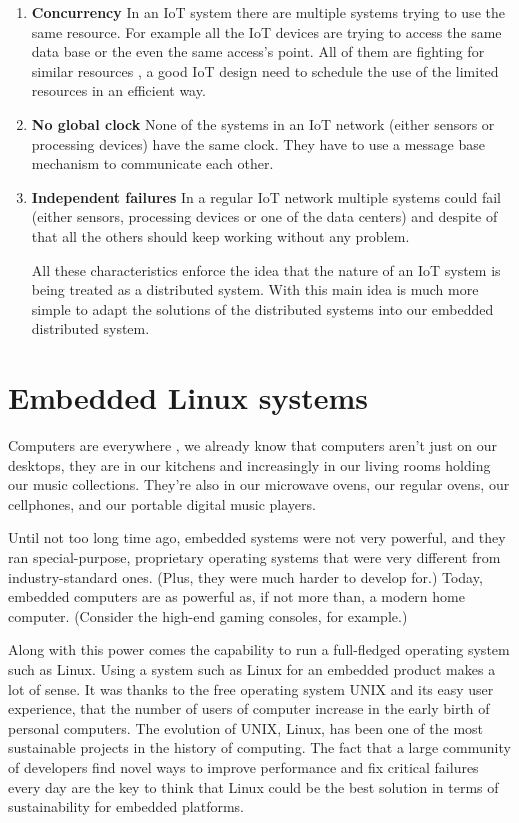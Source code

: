 \begin{enumerate}
\item \textbf{Concurrency}
In an IoT system there are multiple systems trying to use the same resource.
For example all the IoT devices are trying to access the same data base or the
even the same access's point. All of them are fighting for similar resources , a
good IoT design need to schedule the use of the limited resources in an efficient
way.

\item \textbf{No global clock}
None of the systems in an IoT network (either sensors or processing devices)
have the same clock. They have to use a message base mechanism to communicate
each other. 

\item \textbf{Independent failures}
In a regular IoT network multiple systems could fail (either sensors,
processing devices or one of the data centers) and despite of that all the
others should keep working without any problem. 

All these characteristics enforce the idea that the nature of an IoT system is
being treated as a distributed system. With this main idea is much more simple
to adapt the solutions of the distributed systems into our embedded distributed
system.

\end{enumerate}


\section{Embedded Linux systems}

Computers are everywhere , we already know that computers aren't just on our
desktops, they are in our kitchens  and increasingly in our living rooms
holding our music collections. They're also in our microwave ovens, our regular
ovens, our cellphones, and our portable digital music players.

Until not too long time ago, embedded systems were not very powerful, and they
ran special-purpose, proprietary operating systems that were very different
from industry-standard ones. (Plus, they were much harder to develop for.)
Today, embedded computers are as powerful as, if not more than, a modern home
computer. (Consider the high-end gaming consoles, for example.)

Along with this power comes the capability to run a full-fledged operating
system such as Linux. Using a system such as Linux for an embedded product
makes a lot of sense. It was thanks to the free operating system UNIX and its
easy user experience, that the number of users of computer increase in the
early birth of personal computers. The evolution of UNIX, Linux, has been one
of the most sustainable projects in the history of computing. The fact that a
large community of developers find novel ways to improve performance and fix
critical failures every day are the key to think that Linux could be the best
solution in terms of sustainability for embedded platforms.


